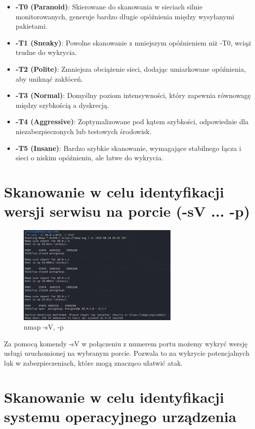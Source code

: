 \documentclass{article}
\begin{document}
\begin{itemize}
  \item \textbf{-T0 (Paranoid)}: Skierowane do skanowania w sieciach silnie monitorowanych, generuje bardzo długie opóźnienia między wysyłanymi pakietami.
  \item \textbf{-T1 (Sneaky)}: Powolne skanowanie z mniejszym opóźnieniem niż -T0, wciąż trudne do wykrycia.
  \item \textbf{-T2 (Polite)}: Zmniejsza obciążenie sieci, dodając umiarkowane opóźnienia, aby uniknąć zakłóceń.
  \item \textbf{-T3 (Normal)}: Domyślny poziom intensywności, który zapewnia równowagę między szybkością a dyskrecją.
  \item \textbf{-T4 (Aggressive)}: Zoptymalizowane pod kątem szybkości, odpowiednie dla niezabezpieczonych lub testowych środowisk.
  \item \textbf{-T5 (Insane)}: Bardzo szybkie skanowanie, wymagające stabilnego łącza i sieci o niskim opóźnieniu, ale łatwe do wykrycia.
\end{itemize}

\section*{Skanowanie w celu identyfikacji wersji serwisu na porcie (-sV ... -p)}

\begin{figure}[H]
  \centering
  \includegraphics[width=0.7\textwidth]{nmap_port_wersja.png}
  \caption{nmap -sV, -p}
\end{figure}

Za pomocą komendy -sV w połączeniu z numerem portu możemy wykryć wersję usługi uruchomionej na wybranym porcie. Pozwala to na wykrycie potencjalnych luk w zabezpieczeniach, które mogą znacząco ułatwić atak.

\section*{Skanowanie w celu identyfikacji systemu operacyjnego urządzenia}
\end{document}
